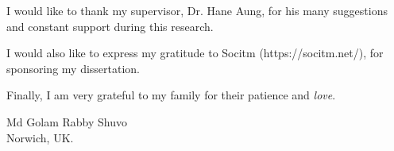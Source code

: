
\def\baselinestretch{1.0}


I would like to thank my supervisor, Dr. Hane Aung, for his many suggestions and constant support during this research. 

\noindent
I would also like to express my gratitude to Socitm (https://socitm.net/), for sponsoring my dissertation.

\medskip

\noindent
Finally, I am very grateful to my family for their patience and {\em love}.

\bigskip\medskip

\noindent
\vskip0.4in  
\hfill Md Golam Rabby Shuvo \\
\vskip0.2in 
\hfill Norwich, UK.\\

